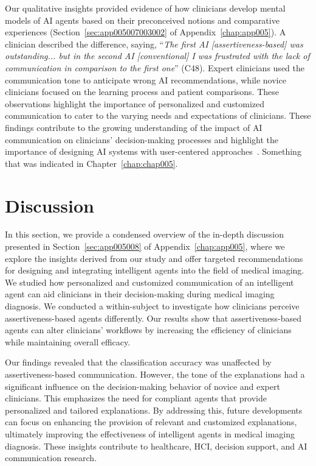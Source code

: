Our qualitative insights provided evidence of how clinicians develop mental models of \ac{AI} agents based on their preconceived notions and comparative experiences (Section~\ref{sec:app005007003002} of Appendix~\ref{chap:app005}).
A clinician described the difference, saying, ``{\it The first AI [assertiveness-based] was outstanding... but in the second AI [conventional] I was frustrated with the lack of communication in comparison to the first one}'' (C48).
Expert clinicians used the communication tone to anticipate wrong \ac{AI} recommendations, while novice clinicians focused on the learning process and patient comparisons.
These observations highlight the importance of personalized and customized communication to cater to the varying needs and expectations of clinicians.
These findings contribute to the growing understanding of the impact of \ac{AI} communication on clinicians' decision-making processes and highlight the importance of designing \ac{AI} systems with user-centered approaches~\cite{10.1145/3491102.3517789}.
Something that was indicated in Chapter~\ref{chap:chap005}.

\section{Discussion}
\label{sec:chap006007}

In this section, we provide a condensed overview of the in-depth discussion presented in Section~\ref{sec:app005008} of Appendix~\ref{chap:app005}, where we explore the insights derived from our study and offer targeted recommendations for designing and integrating intelligent agents into the field of medical imaging.
We studied how personalized and customized communication of an intelligent agent can aid clinicians in their decision-making during medical imaging diagnosis.
We conducted a within-subject to investigate how clinicians perceive assertiveness-based agents differently.
Our results show that assertiveness-based agents can alter clinicians' workflows by increasing the efficiency of clinicians while maintaining overall efficacy.

Our findings revealed that the classification accuracy was unaffected by assertiveness-based communication.
However, the tone of the explanations had a significant influence on the decision-making behavior of novice and expert clinicians.
This emphasizes the need for compliant agents that provide personalized and tailored explanations.
By addressing this, future developments can focus on enhancing the provision of relevant and customized explanations, ultimately improving the effectiveness of intelligent agents in medical imaging diagnosis.
These insights contribute to healthcare, \ac{HCI}, decision support, and \ac{AI} communication research.

